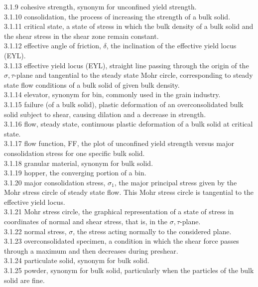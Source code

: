 3.1.9 cohesive strength, synonym for unconfined yield strength. \\
3.1.10 consolidation, the process of increasing the strength of a bulk solid. \\
3.1.11 critical state, a state of stress in which the bulk density of a bulk solid and the shear stress in the shear zone remain constant. \\
3.1.12 effective angle of friction, $\delta$, the inclination of the effective yield locus (EYL). \\
3.1.13 effective yield locus (EYL), straight line passing through the origin of the $\sigma, \tau$-plane and tangential to the steady state Mohr circle, corresponding to steady state flow conditions of a bulk solid of given bulk density. \\
3.1.14 elevator, synonym for bin, commonly used in the grain industry. \\
3.1.15 failure (of a bulk solid), plastic deformation of an overconsolidated bulk solid subject to shear, causing dilation and a decrease in strength. \\
3.1.16 flow, steady state, continuous plastic deformation of a bulk solid at critical state.  \\
3.1.17 flow function, FF, the plot of unconfined yield strength versus major consolidation stress for one specific bulk solid. \\
3.1.18 granular material, synonym for bulk solid. \\
3.1.19 hopper, the converging portion of a bin. \\
3.1.20 major consolidation stress, $\sigma_1$, the major principal stress given by the Mohr stress circle of steady state flow. This Mohr stress circle is tangential to the effective yield locus. \\
3.1.21 Mohr stress circle, the graphical representation of a state of stress in coordinates of normal and shear stress, that is, in the $\sigma, \tau$-plane. \\
3.1.22 normal stress, $\sigma$, the stress acting normally to the considered plane. \\
3.1.23 overconsolidated specimen, a condition in which the shear force passes through a maximum and then decreases during preshear. \\
3.1.24 particulate solid, synonym for bulk solid. \\
3.1.25 powder, synonym for bulk solid, particularly when the particles of the bulk solid are fine. \\

